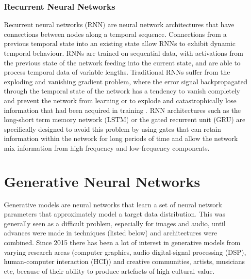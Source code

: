 \subsubsection{Recurrent Neural Networks}

Recurrent neural networks (RNN) are neural network architectures that have connections between nodes along a temporal sequence. 
Connections from a previous temporal state into an existing state allow RNNs to exhibit dynamic temporal behaviour. RNNs are trained on sequential data, with activations from the previous state of the network feeding into the current state, and are able to process temporal data of variable lengths. 
Traditional RNNs suffer from the exploding and vanishing gradient problem, where the error signal backpropagated through the temporal state of the network has a tendency to vanish completely and prevent the network from learning or to explode and catastrophically lose information that had been acquired in training \cite{hochreiter1998vanishing}. 
RNN architectures such as the long-short term memory network (LSTM) \citep{hochreiter1997long} or the gated recurrent unit (GRU) \citep{cho2014properties} are specifically designed to avoid this problem by using gates that can retain information within the network for long periods of time and allow the network mix information from high frequency and low-frequency components. 


 
\section{Generative Neural Networks}

Generative models are neural networks that learn a set of neural network parameters that approximately model a target data distribution. 
This was generally seen as a difficult problem, especially for images and audio, until advances were made in techniques (listed below) and architectures were combined. 
Since 2015 there has been a lot of interest in generative models from varying research areas (computer graphics, audio digital-signal processing (DSP), human-computer interaction (HCI)) and creative communities, artists, musicians etc, because of their ability to produce artefacts of high cultural value. 

